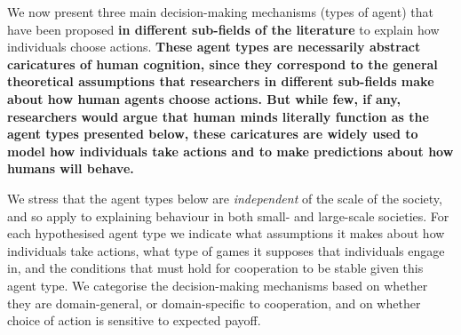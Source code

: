 \documentclass[10pt, a4paper, fleqn]{article}
\begin{document}
We now present three main decision-making mechanisms (types of agent) that have been proposed \textbf{in different sub-fields of the literature} to explain how individuals choose actions. \textbf{These agent types are necessarily abstract caricatures of human cognition, since they correspond to the general theoretical assumptions that researchers in different sub-fields make about how human agents choose actions. But while few, if any, researchers would argue that human minds literally function as the agent types presented below, these caricatures are widely used to model how individuals take actions and to make predictions about how humans will behave.} 

We stress that the agent types below are \textit{independent} of the scale of the society, and so apply to explaining behaviour in both small- and large-scale societies. For each hypothesised agent type we indicate what assumptions it makes about how individuals take actions, what type of games it supposes that individuals engage in, and the conditions that must hold for cooperation to be stable given this agent type. We categorise the decision-making mechanisms based on whether they are domain-general, or domain-specific to cooperation, and on whether choice of action is sensitive to expected payoff. 
\end{document}
